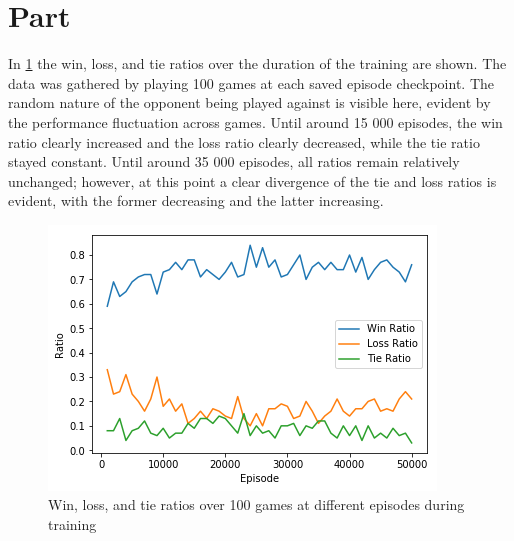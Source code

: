 \documentclass{article}
\newcommand{\enterproblemHeader}[1]{
}
\newcommand{\exitproblemHeader}[1]{
}
\newcounter{problem} %
\newcommand{\problemName}{}
\newenvironment{problem}[1][Part \theproblem]{ %
	\stepcounter{problem} %
	\renewcommand{\problemName}{#1} %
	\section{\problemName} %
	\enterproblemHeader{\problemName} %
}{
	\exitproblemHeader{\problemName} %
}
\begin{document}
\FloatBarrier
\begin{problem}
    In \cref{fig:p6} the win, loss, and tie ratios over the duration of the training are shown. The data was gathered by playing 100 games at each saved episode checkpoint. The random nature of the opponent being played against is visible here, evident by the performance fluctuation across games. Until around 15 000 episodes, the win ratio clearly increased and the loss ratio clearly decreased, while the tie ratio stayed constant. Until around 35 000 episodes, all ratios remain relatively unchanged; however, at this point a clear divergence of the tie and loss ratios is evident, with the former decreasing and the latter increasing.

    \begin{figure}
    \includegraphics[width=\linewidth]{part6.png}
    \caption{Win, loss, and tie ratios over 100 games at different episodes during training}
    \label{fig:p6}
    \end{figure}
    	
\end{problem}
\clearpage
\end{document}
